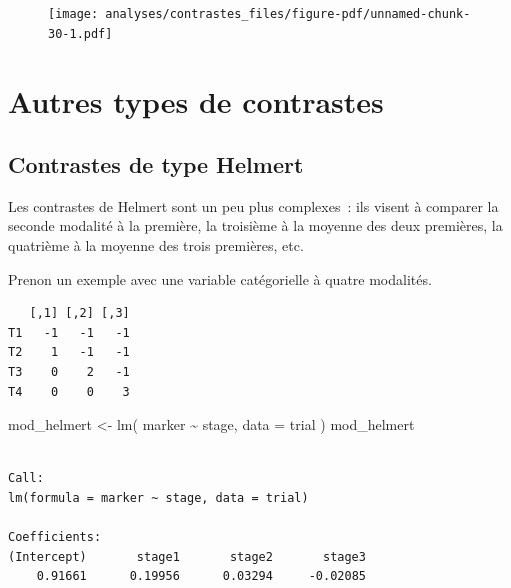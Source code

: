 \documentclass[
  letterpaper,
  DIV=11,
  numbers=noendperiod,
  oneside]{scrreprt}
\newenvironment{Shaded}{\begin{snugshade}}{\end{snugshade}}
\newcommand{\AttributeTok}[1]{\textcolor[rgb]{0.40,0.45,0.13}{#1}}
\newcommand{\FunctionTok}[1]{\textcolor[rgb]{0.28,0.35,0.67}{#1}}
\newcommand{\NormalTok}[1]{\textcolor[rgb]{0.00,0.23,0.31}{#1}}
\newcommand{\OtherTok}[1]{\textcolor[rgb]{0.00,0.23,0.31}{#1}}
\newcommand{\SpecialCharTok}[1]{\textcolor[rgb]{0.37,0.37,0.37}{#1}}
\begin{document}
\begin{figure}[H]

{\centering \texttt{[image: analyses/contrastes\_files/figure-pdf/unnamed-chunk-30-1.pdf]}

}

\end{figure}

\hypertarget{autres-types-de-contrastes}{%
\section{Autres types de contrastes}\label{autres-types-de-contrastes}}

\hypertarget{contrastes-de-type-helmert}{%
\subsection{Contrastes de type
Helmert}\label{contrastes-de-type-helmert}}

Les contrastes de Helmert sont un peu plus complexes~: ils visent à
comparer la seconde modalité à la première, la troisième à la moyenne
des deux premières, la quatrième à la moyenne des trois premières, etc.

Prenon un exemple avec une variable catégorielle à quatre modalités.

\begin{Shaded}
\end{Shaded}

\begin{verbatim}
   [,1] [,2] [,3]
T1   -1   -1   -1
T2    1   -1   -1
T3    0    2   -1
T4    0    0    3
\end{verbatim}

\begin{Shaded}
\begin{Highlighting}[]
\NormalTok{mod\_helmert }\OtherTok{\textless{}{-}} \FunctionTok{lm}\NormalTok{(}
\NormalTok{  marker }\SpecialCharTok{\textasciitilde{}}\NormalTok{ stage,}
  \AttributeTok{data =}\NormalTok{ trial}
\NormalTok{)}
\NormalTok{mod\_helmert}
\end{Highlighting}
\end{Shaded}

\begin{verbatim}

Call:
lm(formula = marker ~ stage, data = trial)

Coefficients:
(Intercept)       stage1       stage2       stage3  
    0.91661      0.19956      0.03294     -0.02085  
\end{verbatim}
\end{document}
